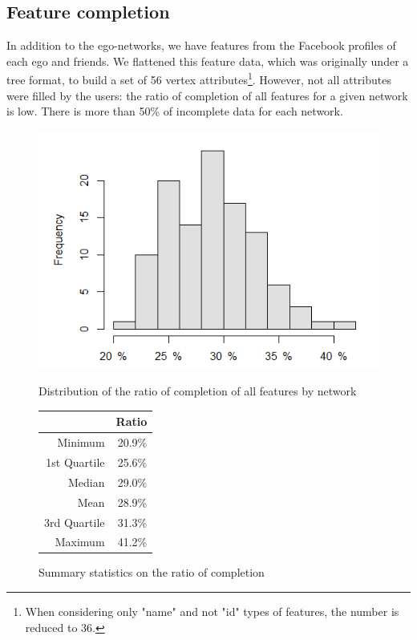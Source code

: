\documentclass[11pt]{article}       %
\begin{document}
\subsection{Feature completion} \label{featurecompletion}
In addition to the ego-networks, we have features from the Facebook profiles of each ego and friends. We flattened this feature data, which was originally under a tree format, to build a set of 56 vertex attributes\footnote{When considering only "name" and not "id" types of features, the number is reduced to 36.}. However, not all attributes were filled by the users: the ratio of completion of all features for a given network is low. There is more than 50\% of incomplete data for each network.

\begin{figure}[H]
\centering
\begin{minipage}[b]{0.47\linewidth}
\vspace{0pt}
\includegraphics[width=\linewidth]{completion.png}
\caption{Distribution of the ratio of completion of all features by network}
\end{minipage}
\hspace{0.5cm}
\begin{minipage}[b]{0.45\linewidth}
\captionsetup{type=table}
\centering
\begin{tabular}[b]{rr}
  \hline
 & Ratio \\ 
  \hline
Minimum & 20.9\% \\ 
  1st Quartile & 25.6\% \\ 
  Median & 29.0\% \\ 
  Mean & 28.9\% \\ 
  3rd Quartile & 31.3\% \\ 
  Maximum & 41.2\% \\ 
   \hline
\end{tabular}
\vspace{0.8cm}
\caption{Summary statistics on the ratio of completion}
\end{minipage}
\end{figure}
\end{document}
